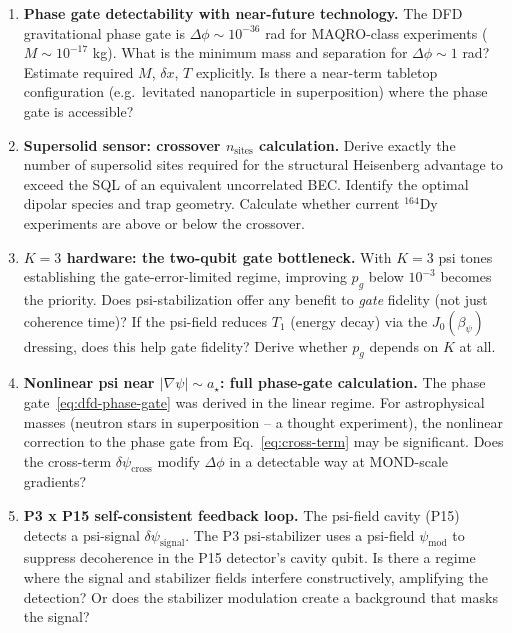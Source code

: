 \documentclass[11pt]{article}
\theoremstyle{definition}
\theoremstyle{remark}
\begin{document}
\begin{enumerate}

\item \textbf{Phase gate detectability with near-future technology.}  The DFD
gravitational phase gate is $\Delta\phi \sim 10^{-36}$ rad for MAQRO-class
experiments ($M \sim 10^{-17}$ kg).  What is the minimum mass and separation
for $\Delta\phi \sim 1$ rad?  Estimate required $M$, $\delta x$, $T$ explicitly.
Is there a near-term tabletop configuration (e.g.\ levitated nanoparticle in
superposition) where the phase gate is accessible?

\item \textbf{Supersolid sensor: crossover $n_{\mathrm{sites}}$ calculation.}
Derive exactly the number of supersolid sites required for the structural Heisenberg
advantage to exceed the SQL of an equivalent uncorrelated BEC.  Identify the optimal
dipolar species and trap geometry.  Calculate whether current $^{164}$Dy experiments
are above or below the crossover.

\item \textbf{$K = 3$ hardware: the two-qubit gate bottleneck.}  With $K=3$ psi
tones establishing the gate-error-limited regime, improving $p_g$ below $10^{-3}$
becomes the priority.  Does psi-stabilization offer any benefit to \emph{gate}
fidelity (not just coherence time)?  If the psi-field reduces $T_1$ (energy decay)
via the $J_0(\beta_\psi)$ dressing, does this help gate fidelity?  Derive whether
$p_g$ depends on $K$ at all.

\item \textbf{Nonlinear psi near $|\nabla\psi| \sim a_\star$: full phase-gate
calculation.}  The phase gate~\eqref{eq:dfd-phase-gate} was derived in the linear
regime.  For astrophysical masses (neutron stars in superposition -- a thought
experiment), the nonlinear correction to the phase gate from Eq.~\eqref{eq:cross-term}
may be significant.  Does the cross-term $\delta\psi_{\mathrm{cross}}$ modify
$\Delta\phi$ in a detectable way at MOND-scale gradients?

\item \textbf{P3 x P15 self-consistent feedback loop.}  The psi-field cavity
(P15) detects a psi-signal $\delta\psi_{\mathrm{signal}}$.  The P3 psi-stabilizer
uses a psi-field $\psi_{\mathrm{mod}}$ to suppress decoherence in the P15
detector's cavity qubit.  Is there a regime where the signal and stabilizer
fields interfere constructively, amplifying the detection?  Or does the stabilizer
modulation create a background that masks the signal?

\end{enumerate}
\end{document}
